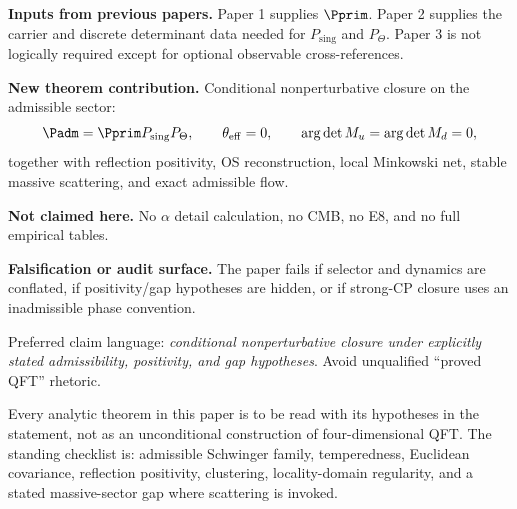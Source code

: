 
\maketitle

\begin{abstract}
This paper isolates the analytic closure layer of TFPT. The selector $\Padm$ is treated as a
physical admissible-sector construction, while the dynamics is carried by $Z_{\mathrm{rel}}$,
admissible Schwinger distributions, Osterwalder--Schrader reconstruction, the local Minkowski net,
stable massive scattering, and the exact admissible RG flow.
\end{abstract}

\begin{tfptfrontbox}
\textbf{Inputs from previous papers.} Paper 1 supplies $\Pprim$. Paper 2 supplies the carrier and
discrete determinant data needed for $P_{\mathrm{sing}}$ and $P_\Theta$. Paper 3 is not logically
required except for optional observable cross-references.

\textbf{New theorem contribution.} Conditional nonperturbative closure on the admissible sector:
\[
\Padm=\Pprim P_{\mathrm{sing}}P_\Theta,\qquad
\theta_{\mathrm{eff}}=0,\qquad
\operatorname{arg}\det M_u=\operatorname{arg}\det M_d=0,
\]
together with reflection positivity, OS reconstruction, local Minkowski net, stable massive
scattering, and exact admissible flow.

\textbf{Not claimed here.} No $\alpha$ detail calculation, no CMB, no E8, and no full empirical
tables.

\textbf{Falsification or audit surface.} The paper fails if selector and dynamics are conflated, if
positivity/gap hypotheses are hidden, or if strong-CP closure uses an inadmissible phase convention.
\end{tfptfrontbox}

\begin{tfptwarningbox}
Preferred claim language: \emph{conditional nonperturbative closure under explicitly stated
admissibility, positivity, and gap hypotheses}. Avoid unqualified ``proved QFT'' rhetoric.
\end{tfptwarningbox}

\begin{tfptwarningbox}
Every analytic theorem in this paper is to be read with its hypotheses in the statement, not as an
unconditional construction of four-dimensional QFT. The standing checklist is: admissible
Schwinger family, temperedness, Euclidean covariance, reflection positivity, clustering,
locality-domain regularity, and a stated massive-sector gap where scattering is invoked.
\end{tfptwarningbox}


